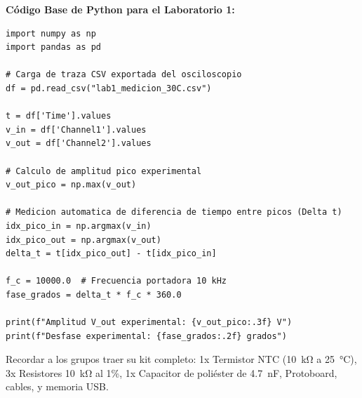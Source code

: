 \documentclass[11pt,a4paper]{article}
\begin{document}
\noindent \textbf{Código Base de Python para el Laboratorio 1:}
\begin{lstlisting}
import numpy as np
import pandas as pd

# Carga de traza CSV exportada del osciloscopio
df = pd.read_csv("lab1_medicion_30C.csv")

t = df['Time'].values
v_in = df['Channel1'].values
v_out = df['Channel2'].values

# Calculo de amplitud pico experimental
v_out_pico = np.max(v_out)

# Medicion automatica de diferencia de tiempo entre picos (Delta t)
idx_pico_in = np.argmax(v_in)
idx_pico_out = np.argmax(v_out)
delta_t = t[idx_pico_out] - t[idx_pico_in]

f_c = 10000.0  # Frecuencia portadora 10 kHz
fase_grados = delta_t * f_c * 360.0

print(f"Amplitud V_out experimental: {v_out_pico:.3f} V")
print(f"Desfase experimental: {fase_grados:.2f} grados")
\end{lstlisting}

\vspace{0.3cm}
\begin{tcolorbox}[colback=gray!5, colframe=black!50, title=\textbf{Lista de Verificación de Hardware para el Miércoles (Lab 1)}]
\small
Recordar a los grupos traer su kit completo: 1x Termistor NTC (\qty{10}{\kilo\ohm} a \qty{25}{\celsius}), 3x Resistores \qty{10}{\kilo\ohm} al 1\%, 1x Capacitor de poliéster de \qty{4.7}{\nano\farad}, Protoboard, cables, y memoria USB.
\end{tcolorbox}
\end{document}
